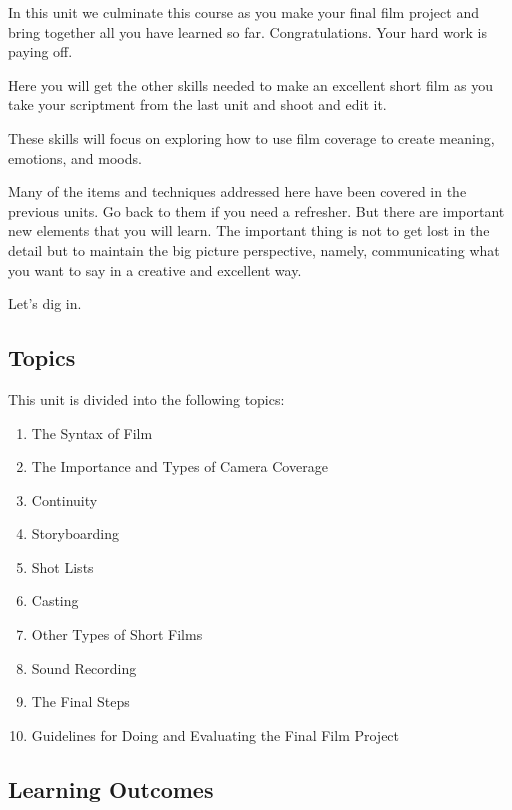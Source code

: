 \documentclass[
  letterpaper,
  DIV=11,
  numbers=noendperiod]{scrreprt}
\providecommand{\tightlist}{%
  \setlength{\itemsep}{0pt}\setlength{\parskip}{0pt}}\usepackage{longtable,booktabs,array}
\begin{document}

In this unit we culminate this course as you make your final film
project and bring together all you have learned so far. Congratulations.
Your hard work is paying off.

Here you will get the other skills needed to make an excellent short
film as you take your scriptment from the last unit and shoot and edit
it.

These skills will focus on exploring how to use film coverage to create
meaning, emotions, and moods.

Many of the items and techniques addressed here have been covered in the
previous units. Go back to them if you need a refresher. But there are
important new elements that you will learn. The important thing is not
to get lost in the detail but to maintain the big picture perspective,
namely, communicating what you want to say in a creative and excellent
way.

Let's dig in.

\subsection*{Topics}\label{topics-8}

This unit is divided into the following topics:

\begin{enumerate}
\def\labelenumi{\arabic{enumi}.}
\tightlist
\item
  The Syntax of Film
\item
  The Importance and Types of Camera Coverage
\item
  Continuity
\item
  Storyboarding
\item
  Shot Lists
\item
  Casting
\item
  Other Types of Short Films
\item
  Sound Recording
\item
  The Final Steps
\item
  Guidelines for Doing and Evaluating the Final Film Project
\end{enumerate}

\subsection*{Learning Outcomes}\label{learning-outcomes-8}
\end{document}
